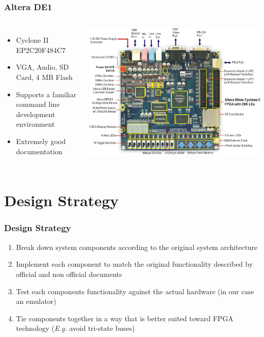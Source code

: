 \documentclass{beamer}
\newlength{\wideitemsep}
\let\olditem\item
\renewcommand{\item}{\setlength{\itemsep}{\wideitemsep}\olditem}
\begin{document}
\begin{frame}
    \frametitle{Altera DE1}

    \begin{columns}[c]
            \begin{itemize}
                \item Cyclone II EP2C20F484C7
                \item VGA, Audio, SD Card, 4 MB Flash
                \item Supports a familiar command line development environment
                \item Extremely good documentation
            \end{itemize}

            \includegraphics[width=\textwidth]{de1.jpg}
    \end{columns}
\end{frame}

\section{Design Strategy}
\begin{frame}
    \frametitle{Design Strategy}
    \begin{enumerate}
        \item<1-> Break down system components according to the original system architecture
        \item<2-> Implement each component to match the original functionality described by official and
            non official documents
        \item<3-> Test each components functionality against the actual hardware (in our case an emulator)
        \item<4-> Tie components together in a way that is better suited toward FPGA technology (\emph{E.g.} avoid tri-state buses)
    \end{enumerate}
\end{frame}
\end{document}
